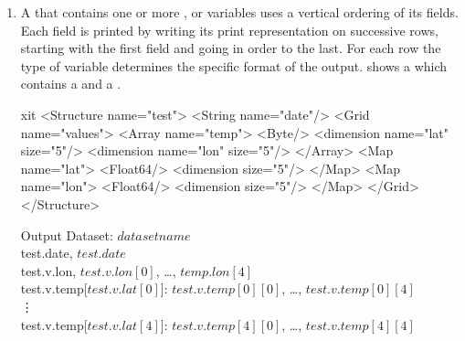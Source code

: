 \documentclass[justify]{dods-paper}
\begin{document}
\begin{enumerate}
\item A \Structure that contains one or more \Array, \Sequence or \Grid
  variables uses a vertical ordering of its fields. Each field is
  printed by writing its print representation on successive rows,
  starting with the first field and going in order to the last. For
  each row the type of variable determines the specific format of the
  output.  shows a \Structure which contains a \String
  and a \Grid.

\begin{minipage}[t]{2.5in}

\begin{vcode}{xit}
<Structure name="test">
  <String name="date"/>
  <Grid name="values">
    <Array name="temp">
      <Byte/>
      <dimension name="lat" size="5"/>
      <dimension name="lon" size="5"/>
    </Array>
    <Map name="lat">
      <Float64/>
      <dimension size="5"/>
    </Map>
    <Map name="lon">
      <Float64/>
      <dimension size="5"/>
    </Map>
  </Grid>
</Structure>
\end{vcode}
\end{minipage}

\begin{minipage}[t]{5in}
\begin{textoutput}{Output}
Dataset: $dataset name$\\
test.date, $test.date$\\
test.v.lon, $test.v.lon[0]$, \ldots, $temp.lon[4]$\\
test.v.temp[$test.v.lat[0]$]: $test.v.temp[0][0]$, \ldots, $test.v.temp[0][4]$\\
\vdots\\
test.v.temp[$test.v.lat[4]$]: $test.v.temp[4][0]$, \ldots, $test.v.temp[4][4]$
\end{textoutput}
\end{minipage}

\end{enumerate}


\subsection{\Sequences}
\label{sec-ascii-sequence}
\end{document}
